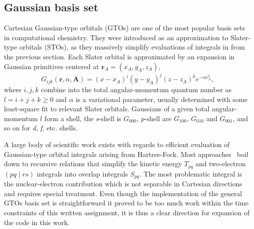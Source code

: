 \documentclass[final,3p,times,twocolumn]{elsarticle}
\begin{document}
	\subsection{Gaussian basis set}
	Cartesian Gaussian-type orbitals (GTOs) are one of the most popular basis sets in computational chemistry. They were introduced as an approximation to Slater-type orbitals (STOs), as they massively simplify evaluations of integrals in from the previous section. Each Slater orbital is approximated by an expansion in Gaussian primitives centered at $\mathbf{r}_A = (x_A, y_A, z_A)$, 
	\begin{equation}
		G_{i j k}(\mathbf{r}, \alpha, \mathbf{A})=(x-x_{A})^{i} (y-y_{A})^{j} (z-z_{A})^{k} e^{-\alpha r_{A}^{2}},
	\end{equation}
	where $i,j,k$ combine into the total angular-momentum quantum number as $l = i+j+k \geq 0$ and $\alpha$ is a variational parameter, usually determined with some least-square fit to relevant Slater orbitals. Gaussians of a given total angular-momentum $l$ form a shell, the \emph{s}-shell is $G_{000}$, \emph{p}-shell are $G_{100}$, $G_{010}$ and $G_{001}$, and so on for \emph{d}, \emph{f}, etc. shells. 
	
	A large body of scientific work exists with regards to efficient evaluation of Gaussian-type orbital integrals arising from Hartree-Fock. Most approaches~\cite{mcmurchie1978one, obara1986efficient} boil down to recursive relations that simplify the kinetic energy $T_{pq}$ and two-electron $(p q \mid r s)$ integrals into overlap integrals $S_{pq}$. The most problematic integral is the nuclear-electron contribution which is not separable in Cartesian directions and requires special treatment. Even though the implementation of the general GTOs basis set is straightforward it proved to be too much work within the time constraints of this written assignment, it is thus a clear direction for expansion of the code in this work. 
\end{document}
